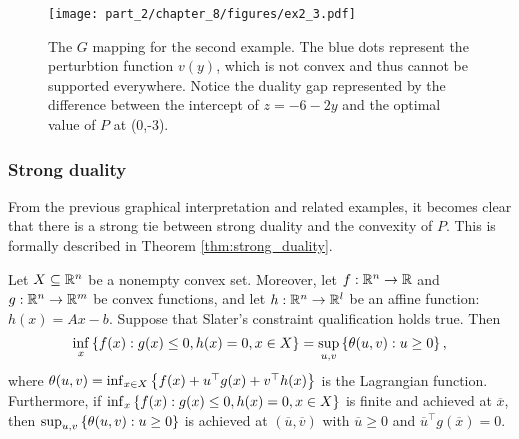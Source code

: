 \begin{figure}
	\texttt{[image: part\_2/chapter\_8/figures/ex2\_3.pdf]}
	\caption{The $G$ mapping for the second example. The blue dots represent the perturbtion function $v(y)$, which is not convex and thus cannot be supported everywhere. Notice the duality gap represented by the difference between the intercept of $z = -6 -2y$ and the optimal value of $P$ at (0,-3).}
\end{figure}
	


\subsubsection{Strong duality}

From the previous graphical interpretation and related examples, it becomes clear that there is a strong tie between strong duality and the convexity of $P$. This is formally described in Theorem \ref{thm:strong_duality}.

\begin{theorem} \label{thm:strong_duality}
	Let $X \subseteq \mathbb{R}^n$ be a nonempty convex set. Moreover, let $f: \mathbb{R}^n \rightarrow \mathbb{R}$ and $g: \mathbb{R}^n \rightarrow \mathbb{R}^m$ be convex functions, and let $h: \mathbb{R}^n \rightarrow \mathbb{R}^l$ be an affine function: $h(x) = Ax - b$. Suppose that Slater's constraint qualification holds true. Then 
	$$ \inf_{x} \left\{ f(x) : g(x) \leq 0, h(x) = 0, x \in X \right \} = \sup_{u,v}\left\{ \theta(u,v) : u \geq 0 \right \},
	$$ 
	where $\theta(u,v) = \inf_{x \in X} \left\{ f(x) + u^\top g(x) + v^\top h(x) \right \}$ is the Lagrangian function. Furthermore, if $\inf_x \left\{ f(x) : g(x) \leq 0, h(x) = 0, x \in X \right \}$ is finite and achieved at $\overline{x}$, then \lb $ \sup_{u,v}\left\{ \theta(u,v) : u \geq 0 \right \}$ is achieved at $(\overline{u},\overline{v})$ with $\overline{u} \geq 0$ and $\overline{u}^\top g(\overline{x}) = 0$.
\end{theorem}

